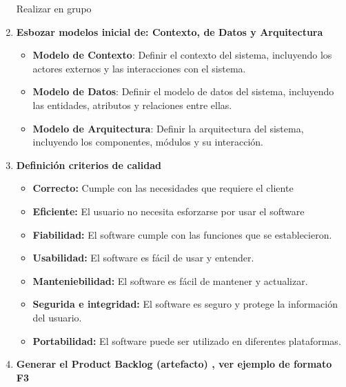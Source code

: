 \begin{doublespace}
\begin{enumerate}[label=\alph*)]
\begin{enumerate}
    \end{enumerate}

\newpage
    Realizar en grupo
    \item \large\textbf{Esbozar modelos inicial de: Contexto, de Datos y Arquitectura}
        \begin{itemize}
            \item \textbf{Modelo de Contexto}: Definir el contexto del sistema, incluyendo los actores externos y las interacciones con el sistema.
            \item \textbf{Modelo de Datos}: Definir el modelo de datos del sistema, incluyendo las entidades, atributos y relaciones entre ellas.
            \item \textbf{Modelo de Arquitectura}: Definir la arquitectura del sistema, incluyendo los componentes, módulos y su interacción.
        \end{itemize}

    \item \large\textbf{Definición criterios de calidad}
    \begin{itemize}
        
        \item \textbf{Correcto:} Cumple con las necesidades que requiere el cliente\par
        \item \textbf{Eficiente:} El usuario no necesita esforzarse por usar el software
        \item \textbf{Fiabilidad:} El software cumple con las funciones que se establecieron.
        \item \textbf{Usabilidad:} El software es fácil de usar y entender.
        \item \textbf{Manteniebilidad:} El software es fácil de mantener y actualizar.
        \item \textbf{Segurida e integridad:} El software es seguro y protege la información del usuario.
        \item \textbf{Portabilidad:} El software puede ser utilizado en diferentes plataformas.

    \end{itemize}


\newpage

\item \large\textbf{Generar el Product Backlog (artefacto) , ver ejemplo de formato F3}


\end{enumerate}
\end{doublespace}
